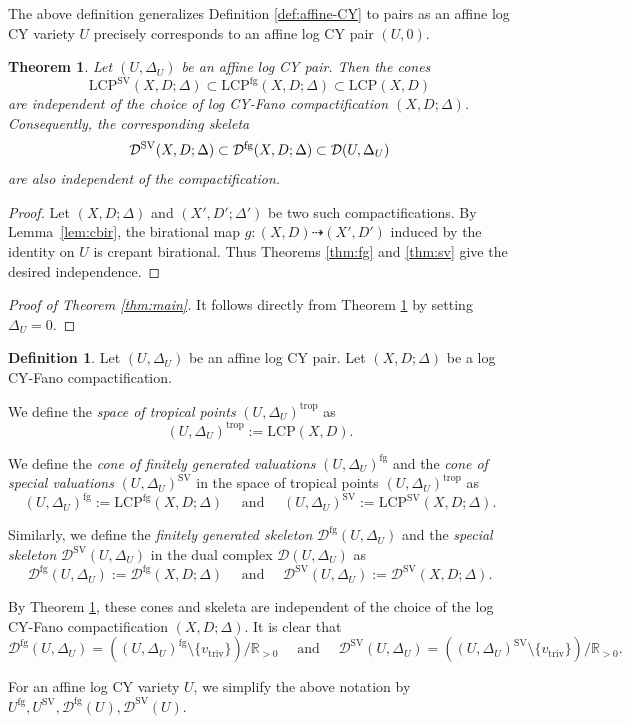 \documentclass[reqno, 12pt]{amsart}
\newtheorem{thm}[prop]{Theorem}
\theoremstyle{definition}
\newtheorem{defn}[prop]{Definition}
\newcommand{\bR}{\mathbb{R}}
\newcommand{\cD}{\mathcal{D}}
\newcommand{\trop}{\mathrm{trop}}
\newcommand{\triv}{\mathrm{triv}}
\newcommand{\SV}{\mathrm{SV}}
\newcommand{\rfg}{\mathrm{fg}}
\newcommand{\LCP}{\mathrm{LCP}}
\numberwithin{equation}{section}
\begin{document}
The above definition generalizes Definition \ref{def:affine-CY} to pairs as an affine log CY variety $U$ precisely corresponds to an affine log CY pair $(U,0)$.

\begin{thm}\label{thm:independence}
Let $(U,\Delta_U)$ be an affine log CY pair. Then the cones 
\[
\LCP^{\SV}(X,D;\Delta)\subset\LCP^{\rfg}(X,D;\Delta)
\subset \LCP(X,D)
\]
are independent of the choice of log CY-Fano compactification
$(X,D;\Delta)$. Consequently, the corresponding skeleta
\[
\cD^{\rm SV}(X,D;\Delta) \subset \cD^{\rm fg}(X,D;\Delta)\subset
\cD(U,\Delta_U)
\]
are also independent of the compactification.
\end{thm}

\begin{proof}
Let $(X,D;\Delta)$ and $(X',D';\Delta')$ be two such
compactifications. By Lemma~\ref{lem:cbir},
the birational map
$g:(X,D)\dashrightarrow(X',D')$
induced by the identity on $U$ is crepant birational. 
Thus Theorems \ref{thm:fg} and \ref{thm:sv} give the desired independence.
\end{proof}



\begin{proof}[Proof of Theorem \ref{thm:main}]
It follows directly from Theorem \ref{thm:independence} by setting $\Delta_U = 0$.
\end{proof}

\begin{defn}
Let $(U,\Delta_U)$ be an affine log CY pair. Let $(X,D;\Delta)$ be a log CY-Fano compactification. 

We define the \emph{space of tropical points} $(U,\Delta_U)^{\trop}$  as 
\[
(U,\Delta_U)^{\trop}:= \LCP(X,D).
\]

We define  the \emph{cone of finitely generated valuations} $(U,\Delta_U)^{\rfg}$ and the \emph{cone of special valuations} $(U,\Delta_U)^{\SV}$ in the space of tropical points $(U,\Delta_U)^{\trop}$ as
\[
(U,\Delta_U)^{\rfg} := \LCP^{\rfg}(X,D;\Delta)\quad \textrm{ and } \quad (U,\Delta_U)^{\SV}:=\LCP^{\SV}(X,D;\Delta).
\]

Similarly, we define the \emph{finitely generated skeleton} $\cD^{\rfg}(U,\Delta_U)$ and the \emph{special skeleton} $\cD^{\SV}(U,\Delta_U)$ in the dual complex $\cD(U,\Delta_U)$ as
\[
\cD^{\rfg}(U,\Delta_U) := \cD^{\rfg}(X,D;\Delta)\quad \textrm{ and } \quad \cD^{\SV}(U,\Delta_U):=\cD^{\SV}(X,D;\Delta).
\]

By Theorem \ref{thm:independence}, these cones and skeleta are independent of the choice of the log CY-Fano compactification $(X,D;\Delta)$.
It is clear that 
\[
\cD^{\rfg}(U,\Delta_U) = ((U,\Delta_U)^{\rfg}\setminus \{v_{\triv}\})/\bR_{>0}\quad \textrm{ and }\quad \cD^{\SV}(U,\Delta_U) = ((U,\Delta_U)^{\SV}\setminus \{v_{\triv}\})/\bR_{>0}.
\]

For an affine log CY variety $U$, we simplify the above notation by $U^{\rfg}, U^{\SV}, \cD^{\rfg}(U), \cD^{\SV}(U)$.  
\end{defn}
\end{document}

